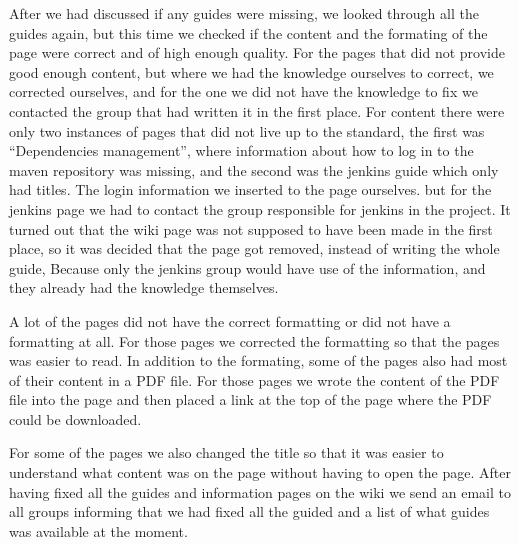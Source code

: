 After we had discussed if any guides were missing, we looked through all the guides again, but this time we checked if the content and the formating of the page were correct and of high enough quality. For the pages that did not provide good enough content, but where we had the knowledge ourselves to correct, we corrected ourselves, and for the one we did not have the knowledge to fix we contacted the group that had written it in the first place. For content there were only two instances of pages that did not live up to the standard, the first was “Dependencies management”, where information about how to log in to the maven repository was missing, and the second was the jenkins guide which only had titles. The login information we inserted to the page ourselves. but for the jenkins page we had to contact the group responsible for jenkins in the project. It turned out that the wiki page was not supposed to have been made in the first place, so it was decided that the page got removed, instead of writing the whole guide, Because only the jenkins group would have use of the information, and they already had the knowledge themselves.

A lot of the pages did not have the correct formatting or did not have a formatting at all. For those pages we corrected the formatting so that the pages was easier to read. In addition to the formating, some of the pages also had most of their content in a PDF file. For those pages we wrote the content of the PDF file into the page and then placed a link at the top of the page where the PDF could be downloaded.

For some of the pages we also changed the title so that it was easier to understand what content was on the page without having to open the page.
After having fixed all the guides and information pages on the wiki we send an email to all groups informing that we had fixed all the guided and a list of what guides was available at the moment.

